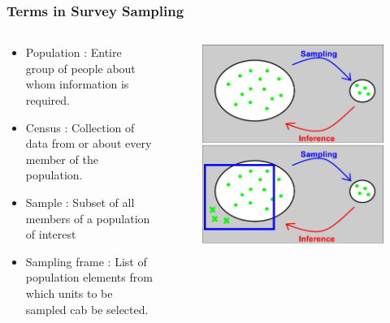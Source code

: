 \documentclass[10pt, compress]{beamer}
\begin{document}
\begin{frame}
    \frametitle{Terms in Survey Sampling}
    \begin{columns}
        \begin{block}{}
            \begin{itemize}
                \item \alert{Population} : Entire group of people about whom information
                is required.
                \item \alert{Census} : Collection of data from or about every member of
                the population.
                \item \alert{Sample} : Subset of all members of a population of interest
                \item \alert{Sampling frame} : List of population elements from which
                units to be sampled cab be selected.
            \end{itemize}
        \end{block}
        \begin{block}{}
            \begin{figure}
                \begin{center}
                    \includegraphics[scale=0.1]{img/PopulationFrame.png}
                \end{center}
            \end{figure}
        \end{block}
    \end{columns}
\end{frame}
\end{document}

